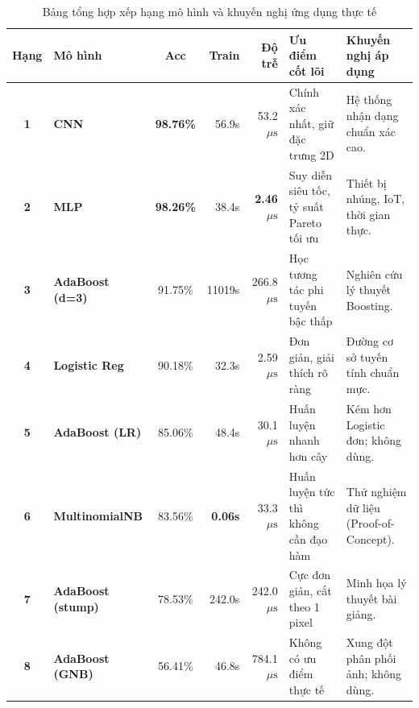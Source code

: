 \begin{table}[htbp]
    \centering
    \footnotesize
    \caption{Bảng tổng hợp xếp hạng mô hình và khuyến nghị ứng dụng thực tế}
    \label{tab:ranking_recommendations}
    \vspace{0.15cm}
    \renewcommand{\arraystretch}{1.2}
    \begin{tabularx}{\textwidth}{c l c r r X X}
        \toprule
        \textbf{Hạng} & \textbf{Mô hình} & \textbf{Acc} & \textbf{Train} & \textbf{Độ trễ} & \textbf{Ưu điểm cốt lõi} & \textbf{Khuyến nghị áp dụng} \\
        \midrule
        \textbf{1} & \textbf{CNN} & \textbf{98.76\%} & 56.9s & 53.2 $\mu\text{s}$ & Chính xác nhất, giữ đặc trưng 2D & Hệ thống nhận dạng chuẩn xác cao. \\
        \textbf{2} & \textbf{MLP} & \textbf{98.26\%} & 38.4s & \textbf{2.46 $\mu\text{s}$} & Suy diễn siêu tốc, tỷ suất Pareto tối ưu & Thiết bị nhúng, IoT, thời gian thực. \\
        \textbf{3} & \textbf{AdaBoost (d=3)} & 91.75\% & 11019s & 266.8 $\mu\text{s}$ & Học tương tác phi tuyến bậc thấp & Nghiên cứu lý thuyết Boosting. \\
        \textbf{4} & \textbf{Logistic Reg} & 90.18\% & 32.3s & 2.59 $\mu\text{s}$ & Đơn giản, giải thích rõ ràng & Đường cơ sở tuyến tính chuẩn mực. \\
        \textbf{5} & \textbf{AdaBoost (LR)} & 85.06\% & 48.4s & 30.1 $\mu\text{s}$ & Huấn luyện nhanh hơn cây & Kém hơn Logistic đơn; không dùng. \\
        \textbf{6} & \textbf{MultinomialNB} & 83.56\% & \textbf{0.06s} & 33.3 $\mu\text{s}$ & Huấn luyện tức thì không cần đạo hàm & Thử nghiệm dữ liệu (Proof-of-Concept). \\
        \textbf{7} & \textbf{AdaBoost (stump)} & 78.53\% & 242.0s & 242.0 $\mu\text{s}$ & Cực đơn giản, cắt theo 1 pixel & Minh họa lý thuyết bài giảng. \\
        \textbf{8} & \textbf{AdaBoost (GNB)} & 56.41\% & 46.8s & 784.1 $\mu\text{s}$ & Không có ưu điểm thực tế & Xung đột phân phối ảnh; không dùng. \\
        \bottomrule
    \end{tabularx}
\end{table}
